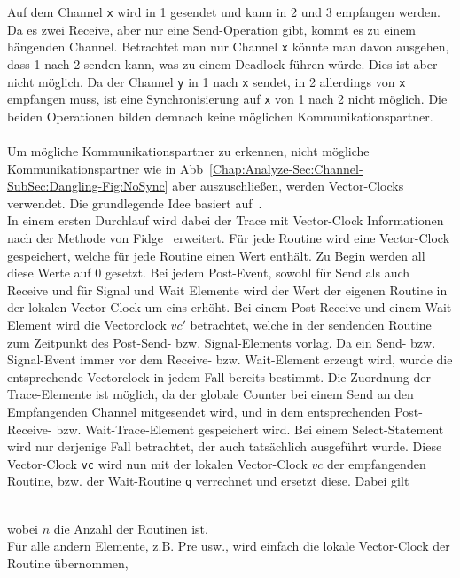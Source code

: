 Auf dem Channel \texttt{x} wird in 1 gesendet und kann in 2 und 3 empfangen werden. Da es zwei Receive, 
aber nur eine Send-Operation gibt, kommt es zu einem hängenden Channel. Betrachtet man nur 
Channel \texttt{x} könnte man davon ausgehen, dass 1 nach 2 senden kann, was zu einem Deadlock
führen würde. Dies ist aber nicht möglich. Da der Channel \texttt{y} in 1 nach \texttt{x} sendet, 
in 2 allerdings von \texttt{x} empfangen muss, ist eine Synchronisierung auf \texttt{x} von 1 nach 
2 nicht möglich. Die beiden Operationen bilden demnach keine möglichen Kommunikationspartner.\\\\
Um mögliche Kommunikationspartner zu erkennen, nicht mögliche Kommunikationspartner wie in 
Abb~\ref{Chap:Analyze-Sec:Channel-SubSec:Dangling-Fig:NoSync} aber auszuschließen, werden
Vector-Clocks verwendet. Die grundlegende Idee basiert auf~\cite{PPDP18}.\\
In einem ersten Durchlauf wird dabei der Trace mit Vector-Clock Informationen nach der Methode 
von Fidge~\cite{Fidge} erweitert. Für jede Routine 
wird eine Vector-Clock gespeichert, welche für jede Routine einen Wert enthält. Zu Begin werden 
all diese Werte auf 0 gesetzt. Bei jedem Post-Event, sowohl für Send als auch Receive und für 
Signal und Wait Elemente wird der Wert der eigenen Routine in der lokalen Vector-Clock um eins 
erhöht. Bei einem Post-Receive und einem Wait Element wird die Vectorclock $vc'$ betrachtet, 
welche in der sendenden Routine zum Zeitpunkt des Post-Send- bzw. Signal-Elements vorlag. 
Da ein Send- bzw. Signal-Event immer vor dem Receive- bzw. Wait-Element erzeugt wird, wurde 
die entsprechende Vectorclock in jedem Fall bereits bestimmt. Die Zuordnung der Trace-Elemente 
ist möglich, da der globale Counter bei einem Send an den Empfangenden Channel mitgesendet 
wird, und in dem entsprechenden Post-Receive- bzw. Wait-Trace-Element gespeichert wird.
Bei einem Select-Statement wird nur derjenige Fall betrachtet, der auch tatsächlich ausgeführt wurde.
Diese Vector-Clock \texttt{vc}
wird nun mit der lokalen Vector-Clock $vc$ der empfangenden Routine, bzw. der Wait-Routine 
\texttt{q} verrechnet und ersetzt diese. Dabei gilt\\
\begin{figure}[h]
  \centering
  
\end{figure}\\
wobei $n$ die Anzahl der Routinen ist.\\
Für alle andern Elemente, z.B. Pre usw., wird einfach die lokale Vector-Clock der Routine übernommen, 
